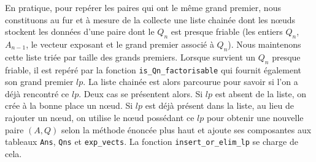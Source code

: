 En pratique, pour repérer les paires qui ont le même grand premier, nous
constituons au fur et à mesure de la collecte une liste chainée dont les nœuds
stockent les données d'une paire dont le $Q_n$ est presque friable (les entiers
$Q_n$, $A_{n-1}$, le vecteur exposant et le grand premier associé à $Q_n$).
Nous maintenons cette liste triée par taille des grands premiers. Lorsque
survient un $Q_n$ presque friable, il est repéré par la fonction
\texttt{is\_Qn\_factorisable} qui fournit également son grand premier $lp$. La
liste chainée est alors parcourue pour savoir si l'on a déjà rencontré ce $lp$.
Deux cas se présentent alors. Si $lp$ est absent de la liste, on crée à la
bonne place un nœud. Si $lp$ est déjà présent dans la liste, au lieu de
rajouter un nœud, on utilise le nœud possédant ce $lp$ pour obtenir une
nouvelle paire $(A,Q)$ selon la méthode énoncée plus haut et ajoute ses
composantes aux tableaux \texttt{Ans}, \texttt{Qns} et \texttt{exp\_vects}. La
fonction \texttt{insert\_or\_elim\_lp} se charge de cela. \\


